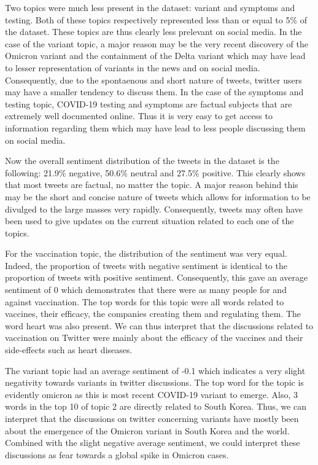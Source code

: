 \documentclass[letterpaper]{article} %
\begin{document}
Two topics were much less present in the dataset: variant and symptoms and testing. Both of these topics respectively represented less than or equal to 5\% of the dataset. These topics are thus clearly less prelevant on social media. In the case of the variant topic,  a major reason may be the very recent discovery of the Omicron variant and the containment of the Delta variant which may have lead to lesser representation of variants in the news and on social media. Consequently, due to the spontaenous and short nature of tweets, twitter users may have a smaller tendency to discuss them. In the case of the symptoms and testing topic, COVID-19 testing and symptoms are factual subjects that are extremely well documented online. Thus it is very easy to get access to information regarding them which may have lead to less people discussing them on social media.

Now the overall sentiment distribution of the tweets in the dataset is the following: 21.9\% negative, 50.6\% neutral and 27.5\% positive. This clearly shows that most tweets are factual, no matter the topic. A major reason behind this may be the short and concise nature of tweets which allows for information to be divulged to the large masses very rapidly. Consequently, tweets may often have been used to give updates on the current situation related to each one of the topics. 

For the vaccination topic, the distribution of the sentiment was very equal. Indeed, the proportion of tweets with negative sentiment is identical to the proportion of tweets with positive sentiment. Consequently, this gave an average sentiment of 0 which demonstrates that there were as many people for and against vaccination. The top words for this topic were all words related to vaccines, their efficacy, the companies creating them and regulating them. The word heart was also present. We can thus interpret that the discussions related to vaccination on Twitter were mainly about the efficacy of the vaccines and their side-effects such as heart diseases. 

The variant topic had an average sentiment of -0.1 which indicates a very slight negativity towards variants in twitter discussions. The top word for the topic is evidently omicron as this is most recent COVID-19 variant to emerge. Also, 3 words in the top 10 of topic 2 are directly related to South Korea. Thus, we can interpret that the discussions on twitter concerning variants have mostly been about the emergence of the Omicron variant in South Korea and the world. Combined with the slight negative average sentiment, we could interpret these discussions as fear towards a global spike in Omicron cases. 
\end{document}

